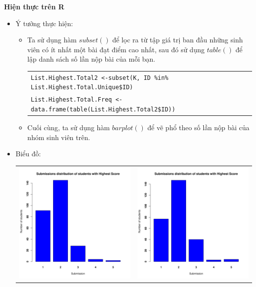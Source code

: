 \documentclass[a4paper]{article}
\theoremstyle{definition}
\begin{document}
\begin{enumerate}[a)]
\begin{itemize}
\begin{itemize}
        \end{itemize}
    \end{itemize}
    \bf Hiện thực trên R\normalfont
    \begin{itemize}
        \item Ý tưởng thực hiện:
        \begin{itemize}
            \item Ta sử dụng hàm $subset()$ để lọc ra từ tập giá trị ban đầu những sinh viên có ít nhất một bài đạt điểm cao nhất, sau đó sử dụng $table()$ để lập danh sách số lần nộp bài của mỗi bạn.
            \begin{center}
                \begin{tabular}{p{13cm}}
                    \texttt{List.Highest.Total2 <-subset(K, ID \%in\% List.Highest.Total.Unique\$ID)}\\
                    \texttt{List.Highest.Total.Freq <- data.frame(table(List.Highest.Total2\$ID))}
                \end{tabular}
            \end{center}
            \item Cuối cùng, ta sử dụng hàm $barplot()$ để vẽ phổ theo số lần nộp bài của nhóm sinh viên trên.
        \end{itemize}
        \item Biểu đồ:\\
        \begin{center}
            \begin{tabular}{c c}
                 \includegraphics[width = 6.9cm]{Images/img2-3-1.png} & \includegraphics[width = 6.9cm]{Images/img2-3-2.png} \\

\end{tabular}
\end{center}
\end{itemize}
\end{enumerate}
\end{document}
